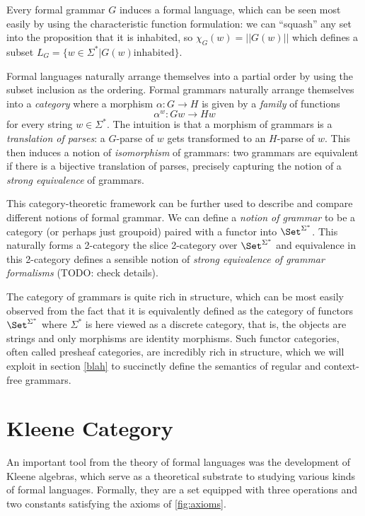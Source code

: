 \documentclass[acmsmall,anonymous,review,screen]{acmart}
\begin{document}
Every formal grammar $G$ induces a formal language, which can be seen
most easily by using the characteristic function formulation: we can
``squash'' any set into the proposition that it is inhabited, so
$\chi_G(w) = ||G(w)||$ which defines a subset $L_G = \{ w \in
\Sigma^*| G(w) \mathrm{inhabited}\}$.

Formal languages naturally arrange themselves into a partial order by
using the subset inclusion as the ordering. Formal grammars naturally
arrange themselves into a \emph{category} where a morphism $\alpha : G
\to H$ is given by a \emph{family} of functions
\[ \alpha^w : Gw \to Hw \]
for every string $w \in \Sigma^*$. The intuition is that a morphism of
grammars is a \emph{translation of parses}: a $G$-parse of $w$ gets
transformed to an $H$-parse of $w$. This then induces a notion of
\emph{isomorphism} of grammars: two grammars are equivalent if there
is a bijective translation of parses, precisely capturing the notion
of a \emph{strong equivalence} of grammars.

This category-theoretic framework can be further used to describe and
compare different notions of formal grammar. We can define a
\emph{notion of grammar} to be a category (or perhaps just groupoid)
paired with a functor into $\Set^{\Sigma^*}$. This naturally forms a
2-category the slice 2-category over $\Set^{\Sigma^*}$ and equivalence
in this 2-category defines a sensible notion of \emph{strong
equivalence of grammar formalisms} (TODO: check details).

The category of grammars is quite rich in structure, which can be most
easily observed from the fact that it is equivalently defined as the
category of functors $\Set^{\Sigma^*}$ where $\Sigma^*$ is here viewed
as a discrete category, that is, the objects are strings and only
morphisms are identity morphisms. Such functor categories, often
called presheaf categories, are incredibly rich in structure, which we
will exploit in section \ref{blah} to succinctly define the semantics
of regular and context-free grammars.

\section{Kleene Category}

An important tool from the theory of formal languages was the development
of Kleene algebras, which serve as a theoretical substrate to studying
various kinds of formal languages. Formally, they are a set equipped
with three operations and two constants satisfying the axioms of
\ref{fig:axioms}.
\end{document}
